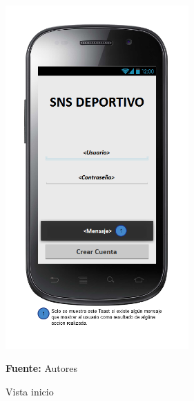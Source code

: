 \begin{figure}[!htb]
  \begin{center}
\includegraphics[width=7cm]{./imagenes/UI/Usuarios/inicio.png}
    \caption{Vista inicio}
    \label{fig:Vista_inicio}
    \textbf{Fuente:}  Autores
  \end{center}
\end{figure}

